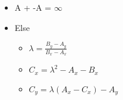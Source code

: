 \begin{itemize}
    \item[] A + -A = $\infty$
    \item[] Else
    \begin{itemize}
        \item[] $\lambda = \frac{B_y - A_y} {B_x - A_x}$
        \item[] $C_x = \lambda^2 - A_x - B_x$
        \item[] $C_y = \lambda(A_x - C_x) - A_y$
    \end{itemize}
\end{itemize}

